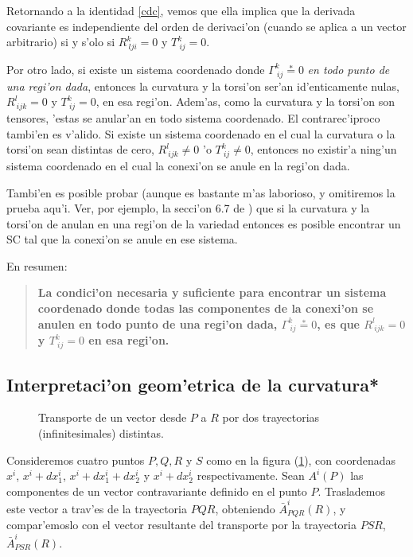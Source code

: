 Retornando a la identidad \eqref{cdc}, vemos que ella implica que la derivada covariante es independiente del orden de derivaci'on (cuando se aplica a un vector arbitrario) si y s'olo si $R_{\ lji}^k=0$ y $T_{\ ij}^{k}=0$.

Por otro lado, si existe un sistema coordenado donde $\Gamma_{\ ij}^k
\overset{\ast}{=}0$ \textit{en todo punto de una regi'on dada}, entonces la curvatura y la torsi'on ser'an id'enticamente nulas, $R_{\ ijk}^l =0$ y $T_{\ ij}^{k}=0$, en esa regi'on. Adem'as, como la curvatura y la torsi'on son tensores, 'estas se anular'an en todo sistema coordenado.
El contrarec'iproco tambi'en es v'alido. Si existe un sistema
coordenado en el cual la curvatura o la torsi'on sean distintas de cero, $R_{\ ijk}^l \neq 0$ 'o $T_{\ ij}^{k}\neq 0$, entonces no existir'a ning'un sistema coordenado en el cual la conexi'on se anule en la regi'on dada.

Tambi'en es posible probar (aunque es bastante m'as laborioso, y omitiremos la prueba aqu'i. Ver, por ejemplo, la secci'on 6.7 de \cite{Dinverno}) que si la curvatura y la torsi'on de anulan en una regi'on de la variedad entonces es posible encontrar un SC tal que la conexi'on se anule en ese sistema.

En resumen:
\begin{quotation}
\textbf{La condici'on necesaria y suficiente para encontrar un sistema coordenado donde todas las componentes de la conexi'on se anulen en todo punto de una regi'on dada, $\Gamma_{\ ij}^k \overset{\ast}{=}0$, es que $R_{\ ijk}^l=0$ y $T_{\ ij}^k =0$ en esa regi'on.}
\end{quotation}

\subsection{Interpretaci'on geom'etrica de la curvatura*}
\begin{center}
\begin{figure}[h!]
\centerline{}
\caption{Transporte de un vector desde $P$ a $R$ por dos trayectorias (infinitesimales) distintas.}
\label{intgeomcurv}
\end{figure}
\end{center}

Consideremos cuatro puntos $P,Q,R$ y $S$ como en la figura (\ref{intgeomcurv}), con coordenadas $x^i $, $x^i+dx_1^i$, $x^i+dx_1^i+dx_2^i$ y $x^i+dx_2^i$ respectivamente.
Sean $A^i (P)$ las componentes de un vector contravariante definido en el punto $P$. Traslademos este vector a trav'es de la trayectoria $PQR$, obteniendo $\bar{A}^i_{PQR}(R)$, y compar'emoslo con el vector resultante del transporte por la trayectoria $PSR$, $\bar{A}^i_{PSR}(R)$.

